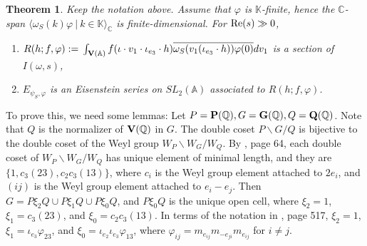\documentclass[11pt]{amsart}
\numberwithin{equation}{section}
\newtheorem{theorem}{Theorem}[section]
\theoremstyle{definition}
\begin{document}
\begin{theorem}\label{key-thm}Keep the notation above. Assume that $\varphi$ is $\mathbb{K}$-finite, hence 
the ${\mathbb{C}}$-span $\langle  \omega_S(k)\varphi\ |\ k\in \mathbb{K} \rangle_{\mathbb{C}}$ is finite-dimensional. 
For ${\rm Re}(s)\gg 0$,   
\begin{enumerate}
\item $R(h;f,\varphi):={\displaystyle}\int_{\bold V({\mathbb{A}})}f(\iota\cdot v_1\cdot \iota_{e_3}\cdot h)\overline{\omega_S(v_1(\iota_{e_3}\cdot h))
\varphi(0)}dv_1$ is a section of $I(\omega,s)$, 
\item $E_{\psi_S,\varphi}$ is an Eisenstein series on $SL_2({\mathbb{A}})$ associated to $R(h;f,\varphi)$.
\end{enumerate}
\end{theorem}
To prove this, we need some lemmas: Let $P=\bold P({\mathbb{Q}}), G=\bold G({\mathbb{Q}}), Q=\bold Q({\mathbb{Q}})$. Note that $Q$ is the normalizer of $\bold V({\mathbb{Q}})$ in $G$.
The double coset $P\backslash G/Q$ is bijective to the double coset of the Weyl group $W_P\backslash W_G/W_Q$. By \cite{Ca}, page 64,
each double coset of $W_P\backslash W_G/W_Q$ has unique element of minimal length, and they are
$\{1, c_3 (2 3), c_2c_3 (1 3)\}$, where $c_i$ is the Weyl group element attached to $2e_i$, and $(i j)$ is the Weyl group element attached to $e_i-e_j$. Then $G=P\xi_2 Q\cup P\xi_1 Q\cup P\xi_0 Q$, and $P\xi_0 Q$ is the unique open cell, where $\xi_2=1$, $\xi_1=c_3 (2 3)$, and $\xi_0=c_2c_3 (1 3)$. 
In terms of the notation in \cite{B}, page 517, 
$\xi_2=1$, $\xi_1=\iota_{e_3}\varphi_{23}$, and $\xi_0=\iota_{e_2}\iota_{e_3}\varphi_{13}$, where 
$\varphi_{ij}=m_{e_{ij}}m_{-e_{ji}}m_{e_{ij}}$ for $i\ne j$.
\end{document}
